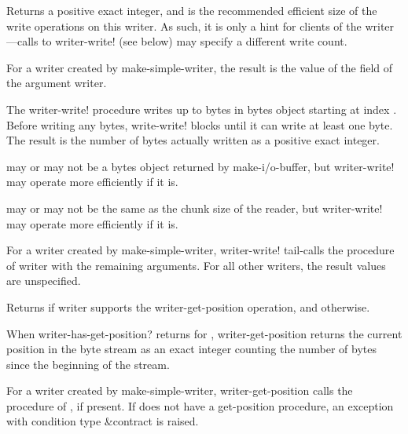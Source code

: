 \begin{entry}{%
}
   
Returns a positive exact integer, and is the recommended efficient
size of the write operations on this writer. As such, it is only a hint for
clients of the writer---calls to {\cf writer-write!} (see below) may specify a
different write count.

For a writer created by {\cf make-simple-writer}, the result is the value of the
 field of the argument writer.
\end{entry}

\begin{entry}{%
}
   
 The {\cf writer-write!} procedure
writes up to  bytes in bytes object 
starting at index . Before writing any bytes, {\cf write-write!} blocks
until it can write at least one byte. The result is the number of bytes
actually written as a positive exact integer.
   
 may or may not be a bytes object returned by {\cf
  make-i/o-buffer}, but {\cf writer-write!} may operate
more efficiently if it is.

 may or may not be the same as the chunk size of the reader, but
 {\cf writer-write!} may operate more efficiently if it is.

For a writer created by {\cf make-simple-writer}, {writer-write!} tail-calls the
 procedure of writer with the remaining arguments.  For
all other writers, the result values are unspecified.
\end{entry}   

\begin{entry}{%
}
   
Returns \schtrue{} if writer supports the {\cf
  writer-get-position} operation, and \schfalse{} otherwise.
\end{entry}   

\begin{entry}{%
}
   
When {\cf writer-has-get-position?} returns \schtrue{} for
, {\cf writer-get-position}
returns the current position in the byte stream as
an exact integer counting the number of bytes since the beginning of
the stream.
  
For a writer created by {\cf make-simple-writer}, 
{\cf writer-get-position} calls the
 procedure of , if present. If 
does not have a get-position procedure, an exception with condition
type {\cf\&contract} is raised.
\end{entry}

